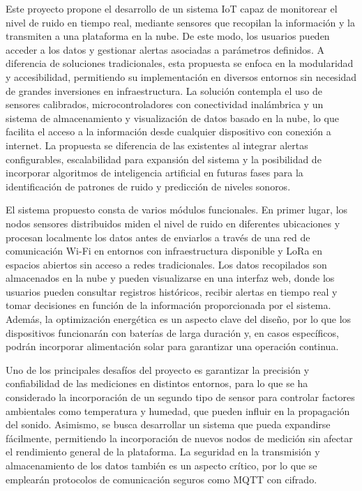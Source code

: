 \documentclass[
11pt, %
]{charter}
\begin{document}
 Este proyecto propone el desarrollo de un sistema IoT capaz de monitorear el nivel de ruido en tiempo real, mediante sensores 
 que recopilan la información y la transmiten a una plataforma en la nube. De este modo, los usuarios pueden acceder a los 
 datos y gestionar alertas asociadas a parámetros definidos. A diferencia de soluciones tradicionales, esta propuesta se 
 enfoca en la modularidad y accesibilidad, permitiendo su implementación en diversos entornos sin necesidad de grandes 
 inversiones en infraestructura.
 La solución contempla el uso de sensores calibrados, microcontroladores con conectividad inalámbrica y un sistema de 
 almacenamiento y visualización de datos basado en la nube, lo que facilita el acceso a la información desde cualquier 
 dispositivo con conexión a internet. La propuesta se diferencia de las existentes al integrar alertas configurables, 
 escalabilidad para expansión del sistema y la posibilidad de incorporar algoritmos de inteligencia artificial en futuras 
 fases para la identificación de patrones de ruido y predicción de niveles sonoros.

 El sistema propuesto consta de varios módulos funcionales. En primer lugar, los nodos sensores distribuidos miden el nivel 
 de ruido en diferentes ubicaciones y procesan localmente los datos antes de enviarlos a través de una red de comunicación 
 Wi-Fi en entornos con infraestructura disponible y LoRa en espacios abiertos sin acceso a redes tradicionales. Los datos 
 recopilados son almacenados en la nube y pueden visualizarse en una interfaz web, donde los usuarios pueden consultar 
 registros históricos, recibir alertas en tiempo real y tomar decisiones en función de la información proporcionada por el 
 sistema. Además, la optimización energética es un aspecto clave del diseño, por lo que los dispositivos funcionarán con 
 baterías de larga duración y, en casos específicos, podrán incorporar alimentación solar para garantizar una operación continua.

 Uno de los principales desafíos del proyecto es garantizar la precisión y confiabilidad de las mediciones en distintos 
 entornos, para lo que se ha considerado la incorporación de un segundo tipo de sensor para controlar factores ambientales 
 como temperatura y humedad, que pueden influir en la propagación del sonido. Asimismo, se busca desarrollar un sistema que 
 pueda expandirse fácilmente, permitiendo la incorporación de nuevos nodos de medición sin afectar el rendimiento general de 
 la plataforma. La seguridad en la transmisión y almacenamiento de los datos también es un aspecto crítico, por lo que se 
 emplearán protocolos de comunicación seguros como MQTT con cifrado.
\end{document}
